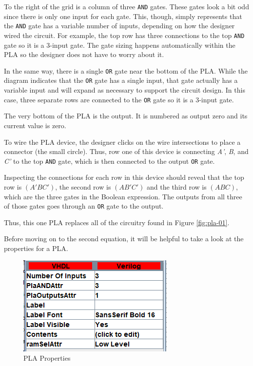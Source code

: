To the right of the grid is a column of three \texttt{AND} gates. These gates look a bit odd since there is only one input for each gate. This, though, simply represents that the \texttt{AND} gate has a variable number of inputs, depending on how the designer wired the circuit. For example, the top row has three connections to the top \texttt{AND} gate so it is a 3-input gate. The gate sizing happens automatically within the \ac{PLA} so the designer does not have to worry about it.

In the same way, there is a single \texttt{OR} gate near the bottom of the \ac{PLA}. While the diagram indicates that the \texttt{OR} gate has a single input, that gate actually has a variable input and will expand as necessary to support the circuit design. In this case, three separate rows are connected to the \texttt{OR} gate so it is a 3-input gate.

The very bottom of the \ac{PLA} is the output. It is numbered as output zero and its current value is zero.

To wire the \ac{PLA} device, the designer clicks on the wire intersections to place a connector (the small circle). Thus, row one of this device is connecting \textit{A'}, \textit{B}, and \textit{C'} to the top \texttt{AND} gate, which is then connected to the output \texttt{OR} gate.

Inspecting the connections for each row in this device should reveal that the top row is $ (A'BC') $, the second row is $ (AB'C') $ and the third row is $ (ABC) $, which are the three gates in the Boolean expression. The outputs from all three of those gates goes through an \texttt{OR} gate to the output. 

Thus, this one \ac{PLA} replaces all of the circuitry found in Figure \ref{fig:pla-01}.

Before moving on to the second equation, it will be helpful to take a look at the properties for a \ac{PLA}.

\begin{figure}[H]
	\centering
	\includegraphics[width=\maxwidth{.95\linewidth}]{gfx/pla-03}
	\caption{PLA Properties}
	\label{fig:pla-04}
\end{figure}

